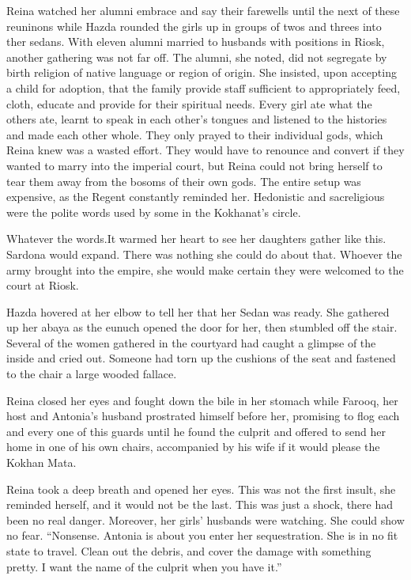 \documentclass{article}
\begin{document}
	Reina watched her alumni embrace and say their farewells until the next of these reuninons while Hazda rounded the girls up in groups of twos and threes into ther sedans. With eleven alumni married to husbands with positions in Riosk, another gathering was not far off. The alumni, she noted, did not segregate by birth religion of native language or region of origin. She insisted, upon accepting a child for adoption, that the family provide staff sufficient to appropriately feed, cloth, educate and provide for their spiritual needs. Every girl ate what the others ate, learnt to speak in each other’s tongues and listened to the histories and made each other whole. They only prayed to their individual gods, which Reina knew was a wasted effort. They would have to renounce and convert if they wanted to marry into the imperial court, but Reina could not bring herself to tear them away from the bosoms of their own gods. The entire setup was expensive, as the Regent constantly reminded her. Hedonistic and sacreligious were the polite words used by some in the Kokhanat’s circle.
	
	Whatever the words.It warmed her heart to see her daughters gather like this. Sardona would expand. There was nothing she could do about that. Whoever the army brought into the empire, she would make certain they were welcomed to the court at Riosk.
	
	Hazda hovered at her elbow to tell her that her Sedan was ready. She gathered up her abaya as the eunuch opened the door for her, then stumbled off the stair. Several of the women gathered in the courtyard had caught a glimpse of the inside and cried out. Someone had torn up the cushions of the seat and fastened to the chair a large wooded fallace. 
	
	Reina closed her eyes and fought down the bile in her stomach while Farooq, her host and Antonia’s husband prostrated himself before her, promising to flog each and every one of this guards until he found the culprit and offered to send her home in one of his own chairs, accompanied by his wife if it would please the Kokhan Mata. 
	
	Reina took a deep breath and opened her eyes. This was not the first insult, she reminded herself, and it would not be the last. This was just a shock, there had been no real danger. Moreover, her girls’ husbands were watching. She could show no fear. “Nonsense. Antonia is about you enter her sequestration. She is in no fit state to travel. Clean out the debris, and cover the damage with something pretty. I want the name of the culprit when you have it.”
	
\end{document}
